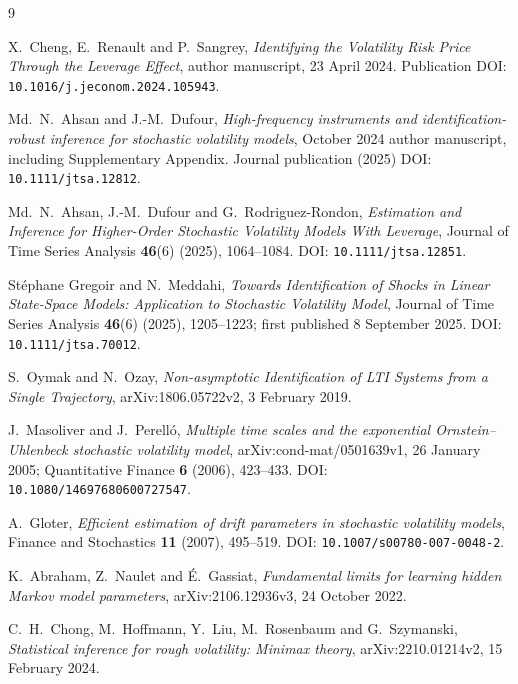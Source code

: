 \documentclass[11pt,a4paper]{amsart}
\theoremstyle{plain}
\theoremstyle{definition}
\theoremstyle{remark}
\begin{document}
\begin{thebibliography}{9}
\enlargethispage{2\baselineskip}

X.~Cheng, E.~Renault and P.~Sangrey,
\emph{Identifying the Volatility Risk Price Through the Leverage Effect},
author manuscript, 23 April 2024.
Publication DOI: \texttt{10.1016/j.jeconom.2024.105943}.

Md.~N.~Ahsan and J.-M.~Dufour,
\emph{High-frequency instruments and identification-robust inference for
stochastic volatility models}, October 2024 author manuscript, including
Supplementary Appendix.
Journal publication (2025) DOI: \texttt{10.1111/jtsa.12812}.

Md.~N.~Ahsan, J.-M.~Dufour and G.~Rodriguez-Rondon,
\emph{Estimation and Inference for Higher-Order Stochastic Volatility
Models With Leverage}, Journal of Time Series Analysis \textbf{46}(6)
(2025), 1064--1084.
DOI: \texttt{10.1111/jtsa.12851}.

St\'ephane Gregoir and N.~Meddahi,
\emph{Towards Identification of Shocks in Linear State-Space Models:
Application to Stochastic Volatility Model}, Journal of Time Series
Analysis \textbf{46}(6) (2025), 1205--1223; first published 8 September
2025. DOI: \texttt{10.1111/jtsa.70012}.

S.~Oymak and N.~Ozay,
\emph{Non-asymptotic Identification of LTI Systems from a Single
Trajectory}, arXiv:1806.05722v2, 3 February 2019.

J.~Masoliver and J.~Perell\'o,
\emph{Multiple time scales and the exponential Ornstein--Uhlenbeck
stochastic volatility model}, arXiv:cond-mat/0501639v1, 26 January 2005;
Quantitative Finance \textbf{6} (2006), 423--433.
DOI: \texttt{10.1080/14697680600727547}.

A.~Gloter,
\emph{Efficient estimation of drift parameters in stochastic volatility
models}, Finance and Stochastics \textbf{11} (2007), 495--519.
DOI: \texttt{10.1007/s00780-007-0048-2}.

K.~Abraham, Z.~Naulet and \'E.~Gassiat,
\emph{Fundamental limits for learning hidden Markov model parameters},
arXiv:2106.12936v3, 24 October 2022.

C.~H.~Chong, M.~Hoffmann, Y.~Liu, M.~Rosenbaum and G.~Szymanski,
\emph{Statistical inference for rough volatility: Minimax theory},
arXiv:2210.01214v2, 15 February 2024.

\end{thebibliography}
\end{document}
